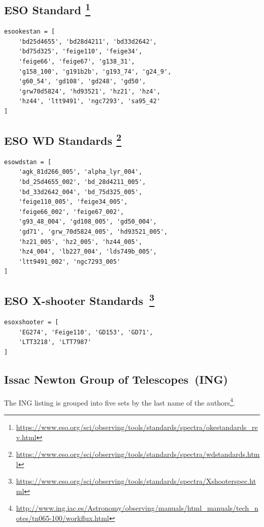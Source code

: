 \documentclass[fleqn,usenatbib]{mnras}
\begin{document}
\subsection*{ESO \citet{1990AJ.....99.1621O} Standard \footnote{\url{https://www.eso.org/sci/observing/tools/standards/spectra/okestandards_rev.html}}}

\begin{verbatim}
esookestan = [
    'bd25d4655', 'bd28d4211', 'bd33d2642',
    'bd75d325', 'feige110', 'feige34',
    'feige66', 'feige67', 'g138_31',
    'g158_100', 'g191b2b', 'g193_74', 'g24_9',
    'g60_54', 'gd108', 'gd248', 'gd50',
    'grw70d5824', 'hd93521', 'hz21', 'hz4',
    'hz44', 'ltt9491', 'ngc7293', 'sa95_42'
]
\end{verbatim}

\subsection*{ESO \citet{1995AJ....110.1316B} WD Standards \footnote{\url{https://www.eso.org/sci/observing/tools/standards/spectra/wdstandards.html}}}
\begin{verbatim}
esowdstan = [
    'agk_81d266_005', 'alpha_lyr_004',
    'bd_25d4655_002', 'bd_28d4211_005',
    'bd_33d2642_004', 'bd_75d325_005',
    'feige110_005', 'feige34_005',
    'feige66_002', 'feige67_002',
    'g93_48_004', 'gd108_005', 'gd50_004',
    'gd71', 'grw_70d5824_005', 'hd93521_005',
    'hz21_005', 'hz2_005', 'hz44_005',
    'hz4_004', 'lb227_004', 'lds749b_005',
    'ltt9491_002', 'ngc7293_005'
]
\end{verbatim}

\subsection*{ESO X-shooter Standards~\citep{2014Msngr.158...16M, 2014A&A...568A...9M}\footnote{\url{https://www.eso.org/sci/observing/tools/standards/spectra/Xshooterspec.html}}}
\begin{verbatim}
esoxshooter = [
    'EG274', 'Feige110', 'GD153', 'GD71',
    'LTT3218', 'LTT7987'
]
\end{verbatim}

\subsection{Issac Newton Group of Telescopes~(ING)}

The ING listing is grouped into five sets by the last name of the authors\footnote{\url{http://www.ing.iac.es/Astronomy/observing/manuals/html_manuals/tech_notes/tn065-100/workflux.html}}.
\end{document}
